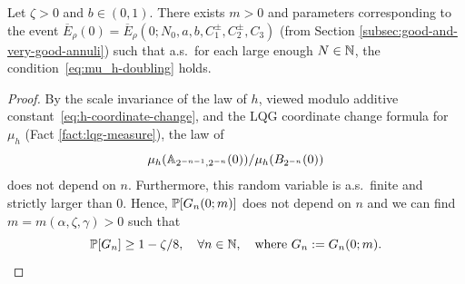 \documentclass[12pt]{amsart}
\numberwithin{equation}{section}
\begin{document}
	\begin{lemma} \label{lemma:doubling-alpha}
		Let $\zeta > 0$ and $b \in (0,1)$. There exists $m > 0$ and parameters corresponding to the event $\overline E_{\rho}(0) = \overline E_{\rho}(0; N_0, a, b, C_1^{\pm}, C_2^{\pm}, C_3)$ (from Section \ref{subsec:good-and-very-good-annuli}) such that a.s.\ for each large enough $N \in \N$, the condition~\eqref{eq:mu_h-doubling} holds.
	\end{lemma}
	\begin{proof}
		By the scale invariance of the law of $h$, viewed modulo additive constant~\eqref{eq:h-coordinate-change}, and the LQG coordinate change formula for $\mu_{h}$ (Fact \ref{fact:lqg-measure}), the law of  
		\[
		\mu_{h}(\A_{2^{-n-1}, 2^{-n}}(0))/\mu_{h}(B_{2^{-n}}(0))
		\]
		does not depend on $n$. 
		Furthermore, this random variable is a.s.\ finite and strictly larger than 0. Hence, 
		$   \P[G_n(0; m)]$ does not depend on $n$ and we can find $m = m(\alpha,\zeta,\gamma) > 0$ such that
		\begin{equation} \label{eq:doubling-prob}
		\P[G_n  ] \geq 1 - \zeta /8 , \quad\forall n\in\N ,\quad \text{where $G_n := G_n(0; m)$} .
		\end{equation} 
		

\end{proof}
\end{document}
